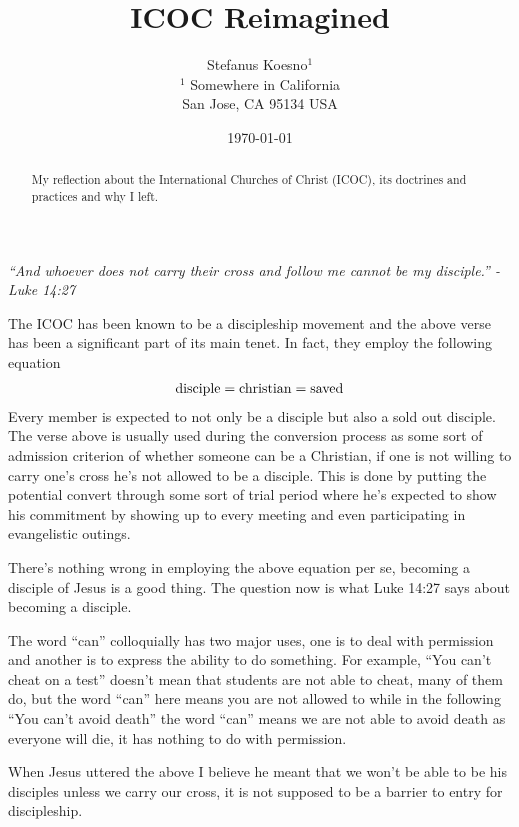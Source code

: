 \documentclass[aps,preprint,preprintnumbers,nofootinbib,showpacs,prd]{revtex4-1}
\newcommand{\nbea}{\begin{eqnarray*}}
\newcommand{\neea}{\end{eqnarray*}}
\begin{document}
\title{ICOC Reimagined}
\bigskip
\author{Stefanus Koesno$^1$\\
$^1$ Somewhere in California\\ San Jose, CA 95134 USA\\
}
%
\date{\today}
%
\begin{abstract}
My reflection about the International Churches of Christ (ICOC), its doctrines and practices and why I left.

\end{abstract}
%
\maketitle

\renewcommand{\theequation}{A.\arabic{equation}}  %
\setcounter{equation}{0}  %



{\it ``And whoever does not carry their cross and follow me cannot be my disciple.'' - Luke 14:27}

The ICOC has been known to be a discipleship movement and the above verse has been a significant part of its main tenet. In fact, they employ the following equation
%
\nbea
{\rm disciple} = {\rm christian} = {\rm saved}
\neea
%
Every member is expected to not only be a disciple but also a sold out disciple. The verse above is usually used during the conversion process as some sort of admission criterion of whether someone can be a Christian, if one is not willing to carry one's cross he's not allowed to be a disciple. This is done by putting the potential convert through some sort of trial period where he's expected to show his commitment by showing up to every meeting and even participating in evangelistic outings. 

There's nothing wrong in employing the above equation per se, becoming a disciple of Jesus is a good thing. The question now is what Luke 14:27 says about becoming a disciple.

The word ``can'' colloquially has two major uses, one is to deal with permission and another is to express the ability to do something. For example, ``You can't cheat on a test'' doesn't mean that students are not able to cheat, many of them do, but the word ``can'' here means you are not allowed to while in the following ``You can't avoid death'' the word ``can'' means we are not able to avoid death as everyone will die, it has nothing to do with permission.

When Jesus uttered the above I believe he meant that we won't be able to be his disciples unless we carry our cross, it is not supposed to be a barrier to entry for discipleship. 
\end{document}
